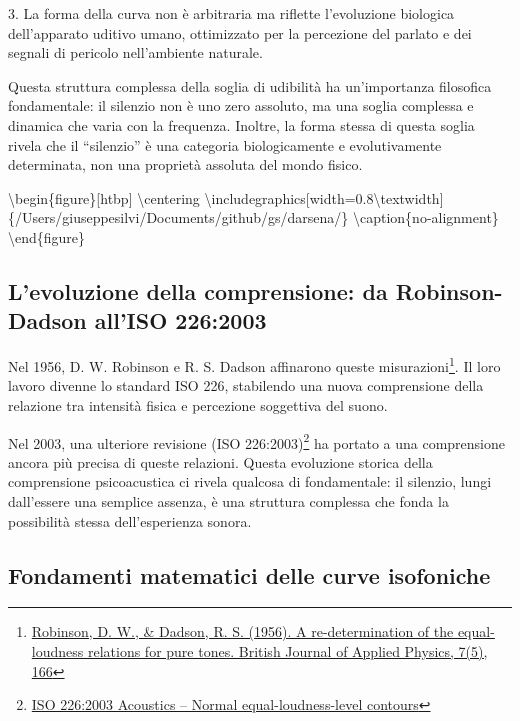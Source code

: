 \documentclass[a4paper,11pt]{article}
\begin{document}
3. La forma della curva non è arbitraria ma riflette l'evoluzione
biologica dell'apparato uditivo umano, ottimizzato per la percezione del
parlato e dei segnali di pericolo nell'ambiente naturale.

Questa struttura complessa della soglia di udibilità ha un'importanza
filosofica fondamentale: il silenzio non è uno zero assoluto, ma una
soglia complessa e dinamica che varia con la frequenza. Inoltre, la
forma stessa di questa soglia rivela che il ``silenzio'' è una categoria
biologicamente e evolutivamente determinata, non una proprietà assoluta
del mondo fisico.

\textbackslash{}begin\{figure\}{[}htbp{]}
  \textbackslash{}centering
  \textbackslash{}includegraphics{[}width=0.8\textbackslash{}textwidth{]}\{/Users/giuseppesilvi/Documents/github/gs/darsena/\}
  \textbackslash{}caption\{no-alignment\}
\textbackslash{}end\{figure\}

\subsection{L'evoluzione della comprensione: da Robinson-Dadson all'ISO 226:2003}\hypertarget{levoluzione-della-comprensione-da-robinson-dadson-alliso-2262003}{}\label{levoluzione-della-comprensione-da-robinson-dadson-alliso-2262003}

Nel 1956, D. W. Robinson e R. S. Dadson affinarono queste
misurazioni\footnote{\href{https://doi.org/10.1121/1.1919119}{Robinson, D. W., \& Dadson, R. S. (1956). A re-determination of
the equal-loudness relations for pure tones. British Journal of
Applied Physics, 7(5), 166}}. Il loro lavoro divenne lo standard ISO 226, stabilendo
una nuova comprensione della relazione tra intensità fisica e percezione
soggettiva del suono.

Nel 2003, una ulteriore revisione (ISO 226:2003)\footnote{\href{https://www.iso.org/standard/34222.html}{ISO 226:2003 Acoustics -- Normal equal-loudness-level
contours}} ha portato a una
comprensione ancora più precisa di queste relazioni. Questa evoluzione
storica della comprensione psicoacustica ci rivela qualcosa di
fondamentale: il silenzio, lungi dall'essere una semplice assenza, è una
struttura complessa che fonda la possibilità stessa dell'esperienza
sonora.

\subsection{Fondamenti matematici delle curve isofoniche}\hypertarget{fondamenti-matematici-delle-curve-isofoniche}{}\label{fondamenti-matematici-delle-curve-isofoniche}
\end{document}
